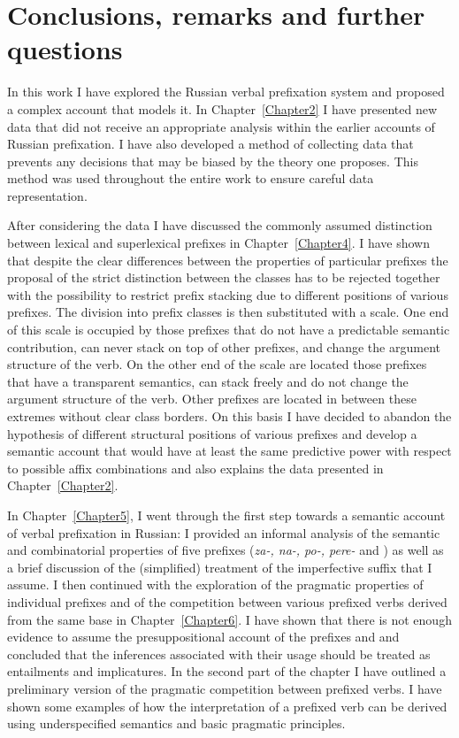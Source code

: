 
\chapter{Conclusions, remarks and further questions} %
\label{Chapter9}

In this work I have explored the Russian verbal prefixation system and proposed a complex account that models it. In Chapter~\ref{Chapter2} I have presented new data that did not receive an appropriate analysis within the earlier accounts of Russian prefixation. I have also developed a method of collecting data that prevents any decisions that may be biased by the theory one proposes. This method was used throughout the entire work to ensure careful data representation.

After considering the data I have discussed the commonly assumed distinction between lexical and superlexical prefixes in Chapter~\ref{Chapter4}. I have shown that despite the clear differences between the properties of particular prefixes the proposal of the strict distinction between the classes has to be rejected together with the possibility to restrict prefix stacking due to different positions of various prefixes. The division into prefix classes is then substituted with a scale. One end of this scale is occupied by those prefixes that do not have a predictable semantic contribution, can never stack on top of other prefixes, and change the argument structure of the verb. On the other end of the scale are located those prefixes that have a transparent semantics, can stack freely and do not change the argument structure of the verb. Other prefixes are located in between these extremes without clear class borders. On this basis I have decided to abandon the hypothesis of different structural positions of various prefixes and develop a semantic account that would have at least the same predictive power with respect to possible affix combinations and also explains the data presented in Chapter~\ref{Chapter2}.

In Chapter~\ref{Chapter5}, I went through the first step towards a semantic account of verbal prefixation in Russian: I provided an informal analysis of the semantic and combinatorial properties of five prefixes (\textit{za-, na-, po-, pere-} and ) as well as a brief discussion of the (simplified) treatment of the imperfective suffix that I assume. I then continued with the exploration of the pragmatic properties of individual prefixes and of the competition between various prefixed verbs derived from the same base in Chapter~\ref{Chapter6}. I have shown that there is not enough evidence to assume the presuppositional account of the prefixes  and  and concluded that the inferences associated with their usage should be treated as entailments and implicatures. In the second part of the chapter I have outlined a preliminary version of the pragmatic competition between prefixed verbs. I have shown some examples of how the interpretation of a prefixed verb can be derived using underspecified semantics and basic pragmatic principles. 

